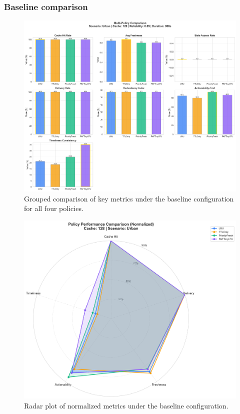 \documentclass[11pt,twocolumn]{article}
\begin{document}
\subsubsection{Baseline comparison}
\begin{figure}[h]
    \centering
    \includegraphics[width=\linewidth]{figures/metrics_grouped_comparison.png}
    \caption{Grouped comparison of key metrics under the baseline configuration for all four policies.}
    \label{fig:baseline-grouped}
\end{figure}

\begin{figure}[h]
    \centering
    \includegraphics[width=\linewidth]{figures/metrics_radar_comparison.png}
    \caption{Radar plot of normalized metrics under the baseline configuration.}
    \label{fig:baseline-radar}
\end{figure}
\end{document}
